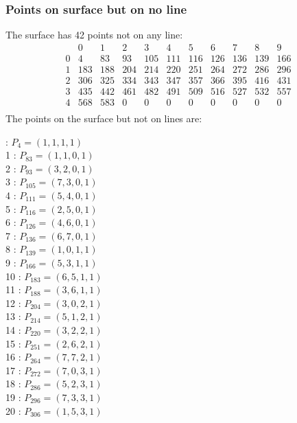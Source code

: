 \documentclass{article}
\begin{document}
{\subsubsection*{Points on surface but on no line}
The surface has 42 points not on any line:\\
$$
\begin{array}{r|*{10}{r}}
 & 0 & 1 & 2 & 3 & 4 & 5 & 6 & 7 & 8 & 9\\
\hline
0 & 4 & 83 & 93 & 105 & 111 & 116 & 126 & 136 & 139 & 166\\
1 & 183 & 188 & 204 & 214 & 220 & 251 & 264 & 272 & 286 & 296\\
2 & 306 & 325 & 334 & 343 & 347 & 357 & 366 & 395 & 416 & 431\\
3 & 435 & 442 & 461 & 482 & 491 & 509 & 516 & 527 & 532 & 557\\
4 & 568 & 583 & 0 & 0 & 0 & 0 & 0 & 0 & 0 & 0\\
\end{array}
$$
The points on the surface but not on lines are:\\
\begin{multicols}{2}
 : $P_{4}=( 1, 1, 1, 1 )$\\
1 : $P_{83}=( 1, 1, 0, 1 )$\\
2 : $P_{93}=( 3, 2, 0, 1 )$\\
3 : $P_{105}=( 7, 3, 0, 1 )$\\
4 : $P_{111}=( 5, 4, 0, 1 )$\\
5 : $P_{116}=( 2, 5, 0, 1 )$\\
6 : $P_{126}=( 4, 6, 0, 1 )$\\
7 : $P_{136}=( 6, 7, 0, 1 )$\\
8 : $P_{139}=( 1, 0, 1, 1 )$\\
9 : $P_{166}=( 5, 3, 1, 1 )$\\
10 : $P_{183}=( 6, 5, 1, 1 )$\\
11 : $P_{188}=( 3, 6, 1, 1 )$\\
12 : $P_{204}=( 3, 0, 2, 1 )$\\
13 : $P_{214}=( 5, 1, 2, 1 )$\\
14 : $P_{220}=( 3, 2, 2, 1 )$\\
15 : $P_{251}=( 2, 6, 2, 1 )$\\
16 : $P_{264}=( 7, 7, 2, 1 )$\\
17 : $P_{272}=( 7, 0, 3, 1 )$\\
18 : $P_{286}=( 5, 2, 3, 1 )$\\
19 : $P_{296}=( 7, 3, 3, 1 )$\\
20 : $P_{306}=( 1, 5, 3, 1 )$\\

\end{multicols}}
\end{document}
